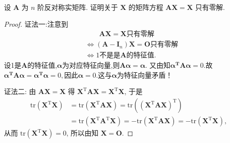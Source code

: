 \documentclass[../../main.tex]{subfiles}%
\begin{document}
\begin{example}
设 $\boldsymbol{A}$ 为 $n$ 阶反对称实矩阵. 证明关于 $\boldsymbol{X}$ 的矩阵方程 $\boldsymbol{AX} = \boldsymbol{X}$ 只有零解.
\end{example}
\begin{proof}

{\color{blue}证法一:}注意到
\begin{align*}
&\quad \quad \boldsymbol{AX}=\boldsymbol{X}\text{只有零解}
\\
&\Longleftrightarrow \left( \boldsymbol{A}-\boldsymbol{I}_n \right) \boldsymbol{X}=\boldsymbol{O}\text{只有零解}
\\
&\Longleftrightarrow 1\text{不是是}\boldsymbol{A}\text{的特征值}.
\end{align*}
设1是$\boldsymbol{A}$的特征值,$\boldsymbol{\alpha }$为对应特征向量,则$\boldsymbol{A\alpha }=\boldsymbol{\alpha }$.
又由知$\boldsymbol{\alpha }^{\boldsymbol{T}}\boldsymbol{A\alpha }=0.$故$\boldsymbol{\alpha }^{\boldsymbol{T}}\boldsymbol{A\alpha }=\boldsymbol{\alpha }^{\boldsymbol{T}}\boldsymbol{\alpha }=0,$因此$\boldsymbol{\alpha }=0.$这与$\boldsymbol{\alpha }$为特征向量矛盾！

{\color{blue}证法二:}
由 $\boldsymbol{AX} = \boldsymbol{X}$ 得 $\boldsymbol{X}^\mathrm{T}\boldsymbol{A}\boldsymbol{X} = \boldsymbol{X}^\mathrm{T}\boldsymbol{X}$, 于是
\begin{align*}
\mathrm{tr}\left( \boldsymbol{X}^\mathrm{T}\boldsymbol{X} \right) &= \mathrm{tr}\left( \boldsymbol{X}^\mathrm{T}\boldsymbol{A}\boldsymbol{X} \right) = \mathrm{tr}\left( \left( \boldsymbol{X}^\mathrm{T}\boldsymbol{A}\boldsymbol{X} \right)^\mathrm{T} \right) \\
&= \mathrm{tr}\left( \boldsymbol{X}^\mathrm{T}\boldsymbol{A}^\mathrm{T}\boldsymbol{X} \right) = -\mathrm{tr}\left( \boldsymbol{X}^\mathrm{T}\boldsymbol{A}\boldsymbol{X} \right) = -\mathrm{tr}\left( \boldsymbol{X}^\mathrm{T}\boldsymbol{X} \right),
\end{align*}
从而 $\mathrm{tr}\left( \boldsymbol{X}^\mathrm{T}\boldsymbol{X} \right) = 0$, 所以由知 $\boldsymbol{X} = \boldsymbol{O}$.

\end{proof}
\end{document}
